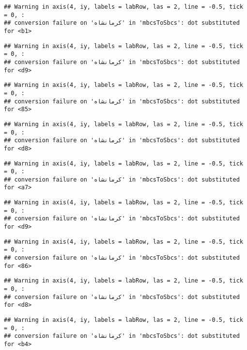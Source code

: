 \documentclass[
]{article}
\begin{document}
\begin{verbatim}
## Warning in axis(4, iy, labels = labRow, las = 2, line = -0.5, tick = 0, :
## conversion failure on 'کرمانشاه' in 'mbcsToSbcs': dot substituted for <b1>
\end{verbatim}

\begin{verbatim}
## Warning in axis(4, iy, labels = labRow, las = 2, line = -0.5, tick = 0, :
## conversion failure on 'کرمانشاه' in 'mbcsToSbcs': dot substituted for <d9>
\end{verbatim}

\begin{verbatim}
## Warning in axis(4, iy, labels = labRow, las = 2, line = -0.5, tick = 0, :
## conversion failure on 'کرمانشاه' in 'mbcsToSbcs': dot substituted for <85>
\end{verbatim}

\begin{verbatim}
## Warning in axis(4, iy, labels = labRow, las = 2, line = -0.5, tick = 0, :
## conversion failure on 'کرمانشاه' in 'mbcsToSbcs': dot substituted for <d8>
\end{verbatim}

\begin{verbatim}
## Warning in axis(4, iy, labels = labRow, las = 2, line = -0.5, tick = 0, :
## conversion failure on 'کرمانشاه' in 'mbcsToSbcs': dot substituted for <a7>
\end{verbatim}

\begin{verbatim}
## Warning in axis(4, iy, labels = labRow, las = 2, line = -0.5, tick = 0, :
## conversion failure on 'کرمانشاه' in 'mbcsToSbcs': dot substituted for <d9>
\end{verbatim}

\begin{verbatim}
## Warning in axis(4, iy, labels = labRow, las = 2, line = -0.5, tick = 0, :
## conversion failure on 'کرمانشاه' in 'mbcsToSbcs': dot substituted for <86>
\end{verbatim}

\begin{verbatim}
## Warning in axis(4, iy, labels = labRow, las = 2, line = -0.5, tick = 0, :
## conversion failure on 'کرمانشاه' in 'mbcsToSbcs': dot substituted for <d8>
\end{verbatim}

\begin{verbatim}
## Warning in axis(4, iy, labels = labRow, las = 2, line = -0.5, tick = 0, :
## conversion failure on 'کرمانشاه' in 'mbcsToSbcs': dot substituted for <b4>
\end{verbatim}
\end{document}
